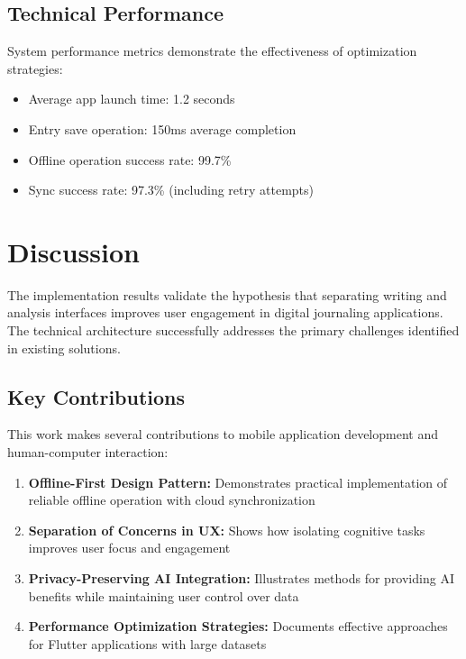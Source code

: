 \documentclass[conference]{IEEEtran}
\begin{document}
\subsection{Technical Performance}

System performance metrics demonstrate the effectiveness of optimization strategies:

\begin{itemize}
\item Average app launch time: 1.2 seconds
\item Entry save operation: 150ms average completion
\item Offline operation success rate: 99.7\%
\item Sync success rate: 97.3\% (including retry attempts)
\end{itemize}

\section{Discussion}

The implementation results validate the hypothesis that separating writing and analysis interfaces improves user engagement in digital journaling applications. The technical architecture successfully addresses the primary challenges identified in existing solutions.

\subsection{Key Contributions}

This work makes several contributions to mobile application development and human-computer interaction:

\begin{enumerate}
\item \textbf{Offline-First Design Pattern:} Demonstrates practical implementation of reliable offline operation with cloud synchronization
\item \textbf{Separation of Concerns in UX:} Shows how isolating cognitive tasks improves user focus and engagement
\item \textbf{Privacy-Preserving AI Integration:} Illustrates methods for providing AI benefits while maintaining user control over data
\item \textbf{Performance Optimization Strategies:} Documents effective approaches for Flutter applications with large datasets
\end{enumerate}
\end{document}

